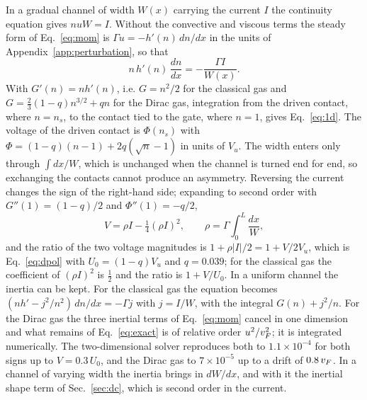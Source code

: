 In a gradual channel of width $W(x)$ carrying the current $I$ the
continuity equation gives $n u W=I$. Without the convective and viscous
terms the steady form of Eq.~\eqref{eq:mom} is $\Gamma u=-h'(n)\,dn/dx$ in
the units of Appendix~\ref{app:perturbation}, so that
\begin{equation}
n\,h'(n)\,\frac{dn}{dx}=-\frac{\Gamma I}{W(x)} .
\end{equation}
With $G'(n)=n h'(n)$, i.e. $G=n^{2}/2$ for the classical gas and
$G=\tfrac23(1-q)n^{3/2}+qn$ for the Dirac gas, integration from the
driven contact, where $n=n_{s}$, to the contact tied to the gate, where
$n=1$, gives Eq.~\eqref{eq:1d}. The voltage of the driven contact is
$\Phi(n_{s})$ with $\Phi=(1-q)(n-1)+2q(\sqrt{n}-1)$ in units of $V_{u}$.
The width enters only through $\int dx/W$, which is unchanged when the
channel is turned end for end, so exchanging the contacts cannot produce
an asymmetry. Reversing the current changes the sign of the right-hand
side; expanding to second order with $G''(1)=(1-q)/2$ and
$\Phi''(1)=-q/2$,
\begin{equation}
V=\rho I-\tfrac14(\rho I)^{2},\qquad \rho=\Gamma\int_{0}^{L}\frac{dx}{W},
\end{equation}
and the ratio of the two voltage magnitudes is $1+\rho|I|/2=1+V/2V_{u}$,
which is Eq.~\eqref{eq:dpol} with $U_{0}=(1-q)V_{u}$ and $q=0.039$; for
the classical gas the coefficient of $(\rho I)^{2}$ is $\tfrac12$ and the ratio
is $1+V/U_{0}$. In a uniform channel the inertia can be kept. For the
classical gas the equation becomes $(nh'-j^{2}/n^{2})\,dn/dx=-\Gamma j$
with $j=I/W$, with the integral $G(n)+j^{2}/n$. For the Dirac gas the
three inertial terms of Eq.~\eqref{eq:mom} cancel in one dimension and
what remains of Eq.~\eqref{eq:exact} is of relative order $u^{2}/v_{F}^{2}$;
it is integrated numerically. The two-dimensional solver reproduces both
to $1.1\times10^{-4}$ for both signs up to $V=0.3\,U_{0}$, and the Dirac
gas to $7\times10^{-5}$ up to a drift of $0.8\,v_{F}$. In a channel of
varying width the inertia brings in $dW/dx$, and with it the inertial
shape term of Sec.~\ref{sec:dc}, which is second order in the current.

